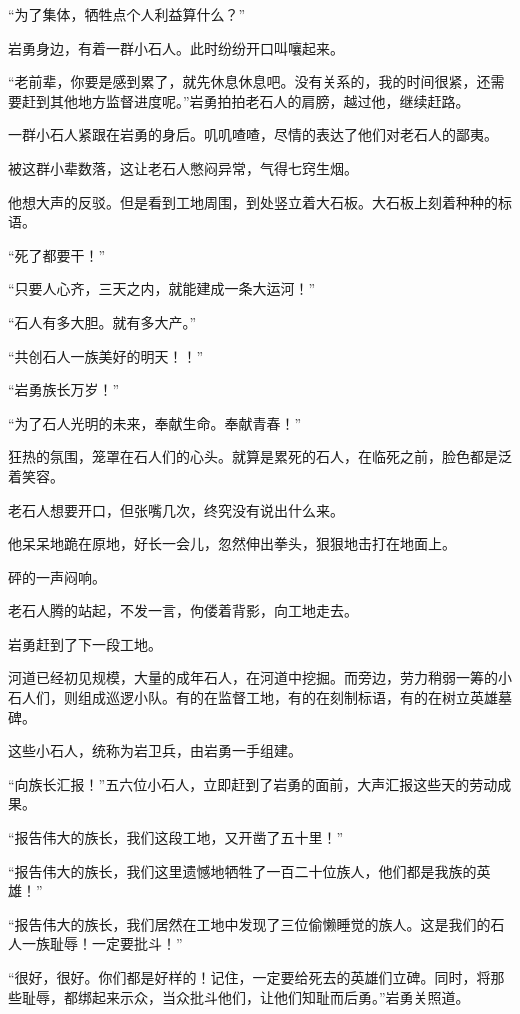 \begin{this_body}
“为了集体，牺牲点个人利益算什么？”

岩勇身边，有着一群小石人。此时纷纷开口叫嚷起来。

“老前辈，你要是感到累了，就先休息休息吧。没有关系的，我的时间很紧，还需要赶到其他地方监督进度呢。”岩勇拍拍老石人的肩膀，越过他，继续赶路。

一群小石人紧跟在岩勇的身后。叽叽喳喳，尽情的表达了他们对老石人的鄙夷。

被这群小辈数落，这让老石人憋闷异常，气得七窍生烟。

他想大声的反驳。但是看到工地周围，到处竖立着大石板。大石板上刻着种种的标语。

“死了都要干！”

“只要人心齐，三天之内，就能建成一条大运河！”

“石人有多大胆。就有多大产。”

“共创石人一族美好的明天！！”

“岩勇族长万岁！”

“为了石人光明的未来，奉献生命。奉献青春！”

狂热的氛围，笼罩在石人们的心头。就算是累死的石人，在临死之前，脸色都是泛着笑容。

老石人想要开口，但张嘴几次，终究没有说出什么来。

他呆呆地跪在原地，好长一会儿，忽然伸出拳头，狠狠地击打在地面上。

砰的一声闷响。

老石人腾的站起，不发一言，佝偻着背影，向工地走去。

岩勇赶到了下一段工地。

河道已经初见规模，大量的成年石人，在河道中挖掘。而旁边，劳力稍弱一筹的小石人们，则组成巡逻小队。有的在监督工地，有的在刻制标语，有的在树立英雄墓碑。

这些小石人，统称为岩卫兵，由岩勇一手组建。

“向族长汇报！”五六位小石人，立即赶到了岩勇的面前，大声汇报这些天的劳动成果。

“报告伟大的族长，我们这段工地，又开凿了五十里！”

“报告伟大的族长，我们这里遗憾地牺牲了一百二十位族人，他们都是我族的英雄！”

“报告伟大的族长，我们居然在工地中发现了三位偷懒睡觉的族人。这是我们的石人一族耻辱！一定要批斗！”

“很好，很好。你们都是好样的！记住，一定要给死去的英雄们立碑。同时，将那些耻辱，都绑起来示众，当众批斗他们，让他们知耻而后勇。”岩勇关照道。


\end{this_body}
